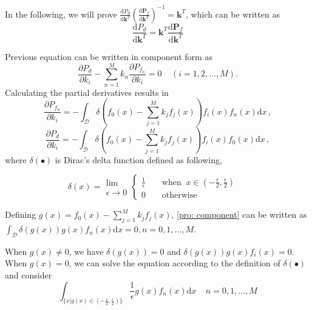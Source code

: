 \documentclass[12pt,journal,a4paper,twoside,onecolumn,draft]{IEEEtran}
\begin{document}
\begin{spacing}{2.5}
In the following, we will prove $ \frac{\mathrm{d}P_d}{\mathrm{d}\mathbf{k}^T}(
\frac{\mathrm{d}\mathbf{P}_f}{\mathrm{d}\mathbf{k}^T}
)^{-1} = \mathbf{k}^T
$, which can be written as
\begin{equation}
\label{pro: vec}
\frac{\mathrm{d}P_d}{\mathrm{d}\mathbf{k}^T} = \mathbf{k}^T \frac{\mathrm{d}\mathbf{P}_f}{\mathrm{d}\mathbf{k}^T}
\end{equation}

Previous equation can be written in component form as
\begin{equation}
\label{pro: component}
\frac{\partial P_d}{\partial k_i} - \sum_{n=1}^{M}k_n\frac{\partial P_{f_n}}{\partial k_i} = 0 \;\;\;\;(i=1, 2, ..., M).
\end{equation}
Calculating the  partial derivatives results in
\begin{equation}
\label{pro: Pf par k}
\frac{\partial P_{f_n}}{ \partial k_i} = - \int_{\mathcal{D}}\delta (f_0(x) - \sum_{j=1}^{M}k_jf_j(x))f_i(x)f_n(x) \mathrm{d}x\,,
\end{equation}
\label{pro: Pd par k}
\begin{equation}\frac{\partial P_d}{ \partial k_i} = - \int_{\mathcal{D}}\delta (f_0(x) - \sum_{j=1}^{M}k_jf_j(x))f_i(x)f_0(x) \mathrm{d}x\,,
\end{equation}
where $\delta(\bullet)$ is Dirac's delta function defined as following,

\begin{equation}
\label{pro: delta}
\delta(x) = \substack{\lim \\ \epsilon \rightarrow 0} \begin{cases}
\frac{1}{\epsilon}\;\;\;\;&\text{when} \;\;x \in (-\frac{\epsilon}{2}, \frac{\epsilon}{2})\\
0\;\;\;\;&\text{otherwise}
\end{cases} \;\;\;\;
\end{equation}

Defining $g(x) = f_0(x) - \sum_{j=1}^{M} k_jf_j(x)$, \eqref{pro: component} can be written as $\int_{\mathcal{D}}\delta(g(x))g(x)f_n(x)\mathrm{d}x = 0, n = 0, 1, ..., M$.

When $g(x) \neq 0$, we have $\delta(g(x)) = 0$ and $\delta(g(x))g(x)f_i(x) = 0$.   When  $g(x) = 0$, we can solve the equation according to the definition of $\delta(\bullet)$ and consider
\begin{equation}
\label{pro: important}
\int_{\{x|g(x)\in (-\frac{\epsilon}{2}, \frac{\epsilon}{2})\}} \frac{1}{\epsilon} g(x)f_n(x) \mathrm{d}x\;\;\;\;n=0, 1, ..., M
\end{equation}


\end{spacing}
\end{document}
